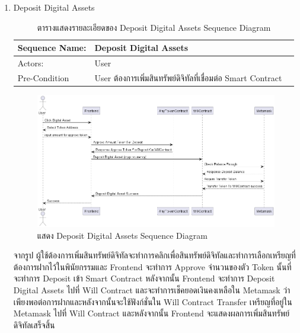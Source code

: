 \documentclass[12pt,oneside,openright,a4paper]{cpe-thai-project}
\begin{document}
\begin{enumerate}[label=\thesubsection.\arabic*,leftmargin=0pt,itemindent=1.25cm]
	
\clearpage
\item Deposit Digital Assets
	\begin{table}[h]
	\centering
	\caption{ตารางแสดงรายละเอียดของ Deposit Digital Assets Sequence Diagram}
	\begin{tabularx}{\textwidth}{|l|X|X|} 
		\hline
		Sequence Name: & Deposit Digital Assets                             \\ 
		\hline
		Actors:        & User                                                  \\ 
		\hline
		Pre-Condition  & User ต้องการเพิ่มสินทรัพย์ดิจิทัลที่เชื่อมต่อ Smart
		  Contract  \\
		\hline
		\end{tabularx}
	\end{table}
		\begin{figure}[!thb]
			\centering
			\includegraphics[scale=0.4]{depositDigitalseq}
			\caption{แสดง Deposit Digital Assets Sequence Diagram}
		\end{figure}
		\FloatBarrier
	\tab จากรูป ผู้ใช้ต้องการเพิ่มสินทรัพย์ดิจิทัลจะทำการคลิกเพื่อสินทรัพย์ดิจิทัลและทำการเลือกเหรียญที่ต้องการฝากไว้ในพินัยกรรมและ Frontend  จะทำการ Approve จำนวนของตัว Token นั้นที่จะทำการ Deposit เข้า Smart Contract หลังจากนั้น Frontend จะทำการ Deposit Digital Assets ไปที่ Will Contract และจะทำการเช็คยอดเงินคงเหลือใน Metamask ว่าเพียงพอต่อการฝากและหลังจากนั้นจะใช้ฟังก์ชั่นใน Will Contract Transfer เหรียญที่อยู่ใน Metamask ไปที่ Will Contract และหลังจากนั้น Frontend จะแสดงผลการเพิ่มสินทรัพย์ดิจิทัลเสร็จสิ้น
	

\end{enumerate}
\end{document}
